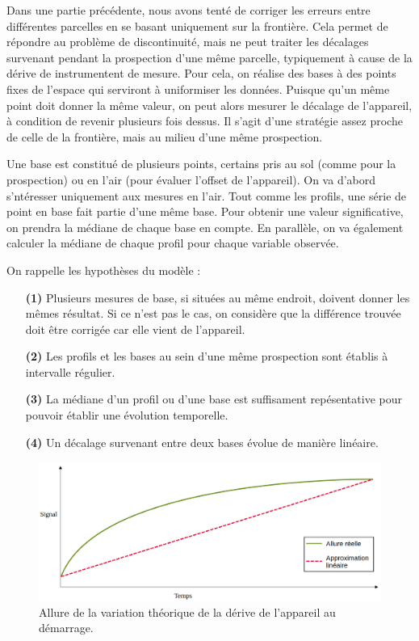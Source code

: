 \documentclass[12pt]{article}
\begin{document}
    \label{2_evol_base} Dans une partie précédente, nous avons tenté de corriger les erreurs entre différentes parcelles en se basant uniquement sur la frontière. Cela permet de répondre au problème de discontinuité, mais ne peut traiter les décalages survenant pendant la prospection d'une même parcelle, typiquement à cause de la dérive de instrumentent de mesure. Pour cela, on réalise des bases à des points fixes de l'espace qui serviront à uniformiser les données. Puisque qu'un même point doit donner la même valeur, on peut alors mesurer le décalage de l'appareil, à condition de revenir plusieurs fois dessus. Il s'agit d'une stratégie assez proche de celle de la frontière, mais au milieu d'une même prospection.

    Une base est constitué de plusieurs points, certains pris au sol (comme pour la prospection) ou en l'air (pour évaluer l'offset de l'appareil). On va d'abord s'ntéresser uniquement aux mesures en l'air. Tout comme les profils, une série de point en base fait partie d'une même base. Pour obtenir une valeur significative, on prendra la médiane de chaque base en compte. En parallèle, on va également calculer la médiane de chaque profil pour chaque variable observée.

    On rappelle les hypothèses du modèle :
    \begin{enumerate}
        \item[\textbf{(1)}] Plusieurs mesures de base, si situées au même endroit, doivent donner les mêmes résultat. Si ce n'est pas le cas, on considère que la différence trouvée doit être corrigée car elle vient de l'appareil.
        \item[\textbf{(2)}] Les profils et les bases au sein d'une même prospection sont établis à intervalle régulier.
        \item[\textbf{(3)}] La médiane d'un profil ou d'une base est suffisament repésentative pour pouvoir établir une évolution temporelle.
        \item[\textbf{(4)}] Un décalage survenant entre deux bases évolue de manière linéaire.
    \end{enumerate}

    \begin{figure}[ht!]
        \centering
        \includegraphics[width=\textwidth]{Images/Base_Vrai_Evol.png}  
        \caption{Allure de la variation théorique de la dérive de l'appareil au démarrage.}
    \end{figure}
\end{document}
